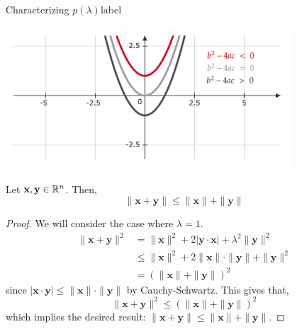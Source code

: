 \begin{ex}{Characterizing $p(\lambda)$}{label}
    \begin{center}
       \includegraphics[width=0.8\textwidth]{figures/wk-1/fig-0.png}
    \end{center}
\end{ex}

\begin{cor}
    Let $\mathbf{x}, \mathbf{y} \in \mathbb{R}^n$. Then,
    \[\|\mathbf{x}+\mathbf{y}\| \leq\|\mathbf{x}\|+\|\mathbf{y}\|\]
\end{cor}

\begin{proof}
     We will consider the case where $\lambda = 1$.
     \begin{align*}
         \|\mathbf{x} + \mathbf{y}\|^2
         &= \|\mathbf{x}\|^2+ 2 |\mathbf{y} \cdot \mathbf{x}| +\lambda^2\|\mathbf{y}\|^2 \\
        &\leq\|\mathbf{x}\|^2+2\|\mathbf{x}\| \cdot\|\mathbf{y}\|+\|\mathbf{y}\|^2 \\
        &=(\|\mathbf{x}\|+\|\mathbf{y}\|)^2
     \end{align*}
     since $|\mathbf{x} \cdot \mathbf{y}|  \leq\|\mathbf{x}\| \cdot \|\mathbf{y}\|$ by Cauchy-Schwartz. This gives that,
     \[\|\mathbf{x} + \mathbf{y}\|^2 \leq (\|\mathbf{x}\|+\|\mathbf{y}\|)^2\]
     which implies the desired result: $\|\mathbf{x}+\mathbf{y}\| \leq\|\mathbf{x}\|+\|\mathbf{y}\|$.
\end{proof}

